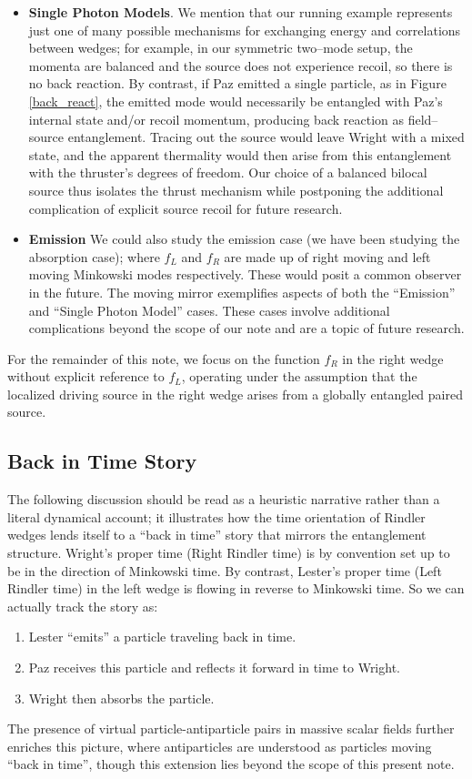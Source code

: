\documentclass[12pt,a4paper]{article}
\begin{document}
{\begin{itemize}
\item {\bf Single Photon Models}. We mention that our running example represents just one of many possible mechanisms for exchanging energy and correlations between wedges; for example, in our symmetric two–mode setup, the momenta are balanced and the source does not experience recoil, so there is no back reaction. By contrast, if Paz emitted a single particle, as in Figure \ref{back_react}, the emitted mode would necessarily be entangled with Paz’s internal state and/or recoil momentum, producing back reaction as field–source entanglement. Tracing out the source would leave Wright with a mixed state, and the apparent thermality would then arise from this entanglement with the thruster’s degrees of freedom. Our choice of a balanced bilocal source thus isolates the thrust mechanism while postponing the additional complication of explicit source recoil for future research.

\item {\bf Emission} We could also study the emission case (we have been studying the absorption case); where $f_L$ and $f_R$ are made up of right moving and left moving Minkowski modes respectively.  These would posit a common observer in the future. The moving mirror exemplifies aspects of both the ``Emission'' and ``Single Photon Model'' cases. These cases involve additional complications beyond the scope of our note and are a topic of future research.
\end{itemize}

For the remainder of this note, we focus on the function $f_R$ in the right wedge without explicit reference to $f_L$, operating under the assumption that the localized driving source in the right wedge arises from a globally entangled paired source.

\subsection{Back in Time Story} \label{sec:back_in_time}
The following discussion should be read as a heuristic narrative rather than a literal dynamical account; it illustrates how the time orientation of Rindler wedges lends itself to a “back in time” story that mirrors the entanglement structure.  Wright's proper time (Right Rindler time) is by convention set up to be in the direction of Minkowski time. By contrast, Lester's proper time (Left Rindler time) in the left wedge is flowing in reverse to Minkowski time.  So we can actually track the story as:
\begin{enumerate}
\item Lester ``emits'' a particle traveling back in time.
\item Paz receives this particle and reflects it forward in time to Wright.
\item Wright then absorbs the particle.
\end{enumerate}
The presence of virtual particle-antiparticle pairs in massive scalar fields further enriches this picture, where antiparticles are understood as particles moving ``back in time'', though this extension lies beyond the scope of this present note.

}
\end{document}
